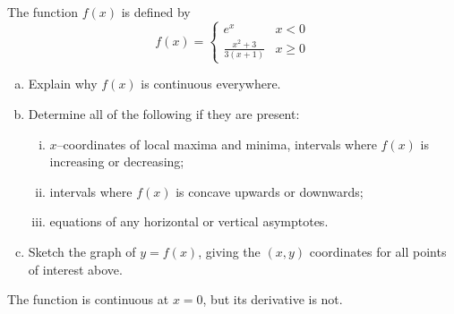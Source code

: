 \begin{Mquestion}[2006H]
The function $f(x)$ is defined by
\[
f(x) =
\left\{\begin{array}{lc}
e^x &x<0\\
 \frac{x^2+3}{3(x+1)} & x \ge 0
 \end{array}\right.
\]
\begin{enumerate}[(a)]
\item\label{s3.6_2006_a} Explain why $f(x)$ is continuous everywhere.
\item\label{s3.6_2006_b} Determine all of the following if they are present:

\begin{enumerate}[i.]
\item\label{s3.6_2006_i} $x$--coordinates of local maxima and minima, intervals
          where $f(x)$ is increasing or decreasing;
\item\label{s3.6_2006_ii} intervals where $f(x)$ is concave upwards or downwards;
\item\label{s3.6_2006_iii} equations of any horizontal or vertical asymptotes.
\end{enumerate}

\item\label{s3.6_2006_c} Sketch the graph of $y = f(x)$, giving the $(x, y)$
coordinates for all points of interest above.
\end{enumerate}
\end{Mquestion}
\begin{hint}
The function is continuous at $x=0$, but its derivative is not.
\end{hint}
